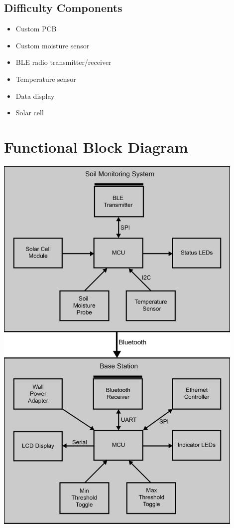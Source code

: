\documentclass{article}
\begin{document}
\subsection{Difficulty Components}
\begin{itemize}
    \item Custom PCB
    \item Custom moisture sensor
    \item BLE radio transmitter/receiver
    \item Temperature sensor
    \item Data display
    \item Solar cell
\end{itemize}

\section{Functional Block Diagram}
\includegraphics[width=0.9\textwidth]{functional_diagram.png}
\end{document}
